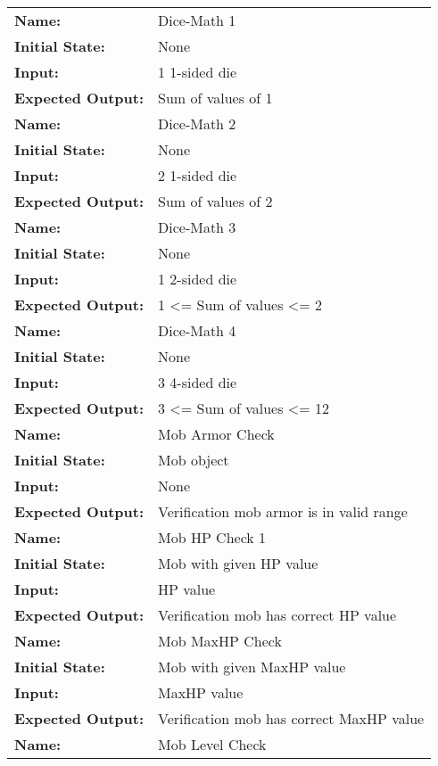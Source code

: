 \documentclass[12pt, titlepage]{article}
\begin{document}
\begin{center}
\begin{longtable}{ l | p{10cm} }
				\rule{0pt}{2em}\textbf{Name:} & Dice-Math 1\\
				\textbf{Initial State:} & None\\
				\textbf{Input:} & 1 1-sided die\\
				\textbf{Expected Output:} & Sum of values of 1\\[1em]
				\hline
				\rule{0pt}{2em}\textbf{Name:} & Dice-Math 2\\
				\textbf{Initial State:} & None\\
				\textbf{Input:} & 2 1-sided die\\
				\textbf{Expected Output:} & Sum of values of 2\\[1em]
				\hline
				\rule{0pt}{2em}\textbf{Name:} & Dice-Math 3\\
				\textbf{Initial State:} & None\\
				\textbf{Input:} & 1 2-sided die\\
				\textbf{Expected Output:} & 1 <= Sum of values <= 2\\[1em]
				\hline
				\rule{0pt}{2em}\textbf{Name:} & Dice-Math 4\\
				\textbf{Initial State:} & None\\
				\textbf{Input:} & 3 4-sided die\\
				\textbf{Expected Output:} & 3 <= Sum of values <= 12\\[1em]
				\hline
				\rule{0pt}{2em}\textbf{Name:} & Mob Armor Check\\
				\textbf{Initial State:} & Mob object\\
				\textbf{Input:} & None\\
				\textbf{Expected Output:} & Verification mob armor is in valid range\\[1em]
				\hline
				\rule{0pt}{2em}\textbf{Name:} & Mob HP Check 1\\
				\textbf{Initial State:} & Mob with given HP value\\
				\textbf{Input:} & HP value\\
				\textbf{Expected Output:} & Verification mob has correct HP value\\[1em]
				\hline
				\rule{0pt}{2em}\textbf{Name:} & Mob MaxHP Check\\
				\textbf{Initial State:} & Mob with given MaxHP value\\
				\textbf{Input:} & MaxHP value\\
				\textbf{Expected Output:} & Verification mob has correct MaxHP value\\[1em]
				\hline
				\rule{0pt}{2em}\textbf{Name:} & Mob Level Check\\

\end{longtable}
\end{center}
\end{document}
